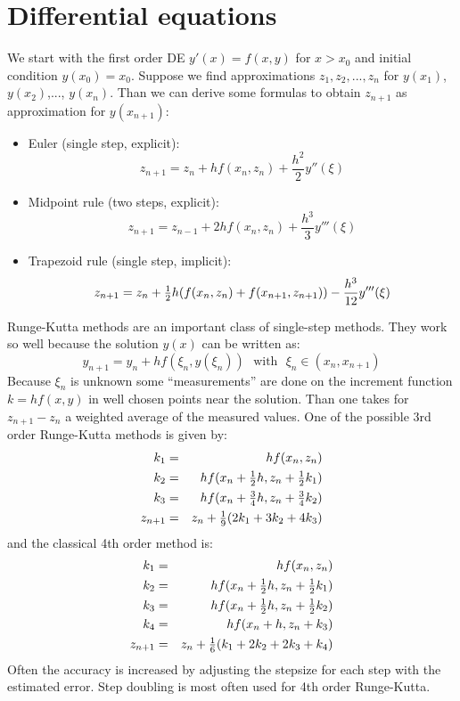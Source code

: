 \documentclass[a4paper,fancyheadings,twoside]{report}
\begin{document}
\section{Differential equations}
We start with the first order DE $y'(x)=f(x,y)$ for $x>x_0$ and initial condition
$y(x_0)=x_0$. Suppose we find approximations $z_1,z_2,...,z_n$ for $y(x_1)$,
$y(x_2)$,..., $y(x_n)$. Than we can derive some formulas to obtain
$z_{n+1}$ as approximation for $y(x_{n+1})$:
\begin{itemize}
\item Euler (single step, explicit):
\[
z_{n+1}=z_n+hf(x_n,z_n)+\frac{h^2}{2}y''(\xi)
\]
\item Midpoint rule (two steps, explicit):
\[
z_{n+1}=z_{n-1}+2hf(x_n,z_n)+\frac{h^3}{3}y'''(\xi)
\]
\item Trapezoid rule (single step, implicit):
\[
z_{n+1}=z_n+\mbox{$\frac{1}{2}$} h(f(x_n,z_n)+f(x_{n+1},z_{n+1}))-\frac{h^3}{12}y'''(\xi)
\]
\end{itemize}
Runge-Kutta methods are an important class of single-step methods. They
work so well because the solution $y(x)$ can be written as:
\[
y_{n+1}=y_n+hf(\xi_n,y(\xi_n))~~~\mbox{with}~~~\xi_n\in(x_n,x_{n+1})
\]
Because $\xi_n$ is unknown some ``measurements'' are done on the
increment function $k=hf(x,y)$ in well chosen points near the solution.
Than one takes for $z_{n+1}-z_n$ a weighted average of the measured values.
One of the possible 3rd order Runge-Kutta methods is given by:
\begin{eqnarray*}
k_1&=&hf(x_n,z_n)\\
k_2&=&hf(x_n+\mbox{$\frac{1}{2}$} h,z_n+\mbox{$\frac{1}{2}$} k_1)\\
k_3&=&hf(x_n+\mbox{$\frac{3}{4}$}h,z_n+\mbox{$\frac{3}{4}$}k_2)\\
z_{n+1}&=&z_n+\mbox{$\frac{1}{9}$}(2k_1+3k_2+4k_3)
\end{eqnarray*}
and the classical 4th order method is:
\begin{eqnarray*}
k_1&=&hf(x_n,z_n)\\
k_2&=&hf(x_n+\mbox{$\frac{1}{2}$} h,z_n+\mbox{$\frac{1}{2}$} k_1)\\
k_3&=&hf(x_n+\mbox{$\frac{1}{2}$} h,z_n+\mbox{$\frac{1}{2}$} k_2)\\
k_4&=&hf(x_n+h,z_n+k_3)\\
z_{n+1}&=&z_n+\mbox{$\frac{1}{6}$}(k_1+2k_2+2k_3+k_4)
\end{eqnarray*}
Often the accuracy is increased by adjusting the stepsize for each step with
the estimated error. Step doubling is most often used for 4th order Runge-Kutta.
\end{document}
